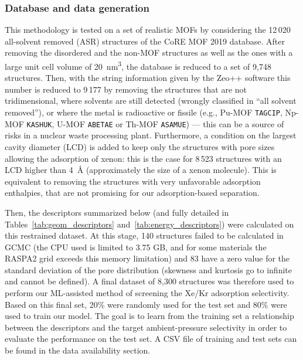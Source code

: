 \documentclass[main]{subfiles}
\begin{document}
\subsubsection{Database and data generation}

This methodology is tested on a set of realistic MOFs by considering the 12\,020 all-solvent removed (ASR) structures of the CoRE MOF 2019 database\autocite{Chung_2019}. After removing the disordered and the non-MOF structures as well as the ones with a large unit cell volume of \SI{20}{\cubic\nano\meter}, the database is reduced to a set of 9,748 structures. Then, with the string information given by the Zeo++ software\autocite{zeopp_Willems2012} this number is reduced to 9\,177 by removing the structures that are not tridimensional, where solvents are still detected (wrongly classified in ``all solvent removed''), or where the metal is radioactive or fissile (e.g., Pu-MOF \texttt{TAGCIP}\autocite{Diwu_2010}, Np-MOF \texttt{KASHUK}\autocite{Martin_2017}, U-MOF \texttt{ABETAE}\autocite{Jouffret_2011} or Th-MOF \texttt{ASAMUE}\autocite{Liang_2016}) --- this can be a source of risks in a nuclear waste processing plant. Furthermore, a condition on the largest cavity diameter (LCD) is added to keep only the structures with pore sizes allowing the adsorption of xenon: this is the case for 8\,523 structures with an LCD higher than \SI{4}{\angstrom} (approximately the size of a xenon molecule). This is equivalent to removing the structures with very unfavorable adsorption enthalpies, that are not promising for our adsorption-based separation.

Then, the descriptors summarized below (and fully detailed in Tables~\ref{tab:geom_descriptors} and~\ref{tab:energy_descriptors}) were calculated on this restrained dataset. At this stage, 140 structures failed to be calculated in GCMC (the CPU used is limited to 3.75 GB, and for some materials the RASPA2 grid exceeds this memory limitation) and 83 have a zero value for the standard deviation of the pore distribution (skewness and kurtosis go to infinite and cannot be defined). A final dataset of 8,300 structures was therefore used to perform our ML-assisted method of screening the Xe/Kr adsorption selectivity. Based on this final set, {20\%} were randomly used for the test set and {80\%} were used to train our model. The goal is to learn from the training set a relationship between the descriptors and the target ambient-pressure selectivity in order to evaluate the performance on the test set. A CSV file of training and test sets can be found in the data availability section.
\end{document}
